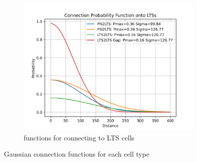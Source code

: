 \documentclass[12pt, letterpaper]{article}
\begin{document}
\begin{figure}[H]
\begin{subfigure}{.4\textwidth}
    \centering
    \includegraphics[width=\linewidth]{connections/onto-lts-functions}
    \caption{functions for connecting to LTS cells}
    \label{fig:Gaussian LTS}
  \end{subfigure}
  \caption{Gaussian connection functions for each cell type}
  \label{fig:Gaussian connection functions}
\end{figure}
\end{document}
